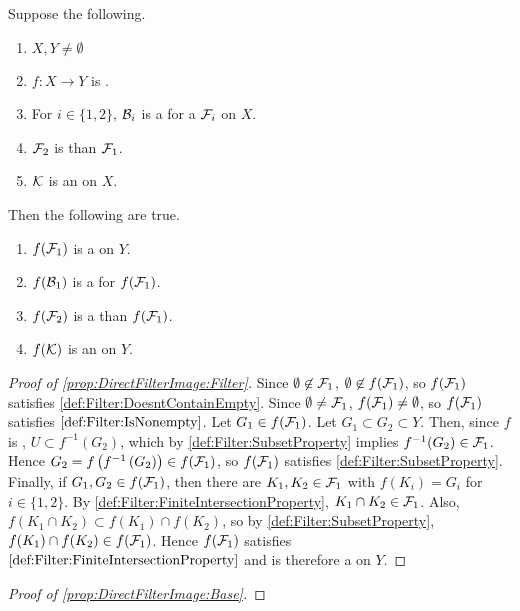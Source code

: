 \begin{prop}
\label{prop:DirectFilterImage}
Suppose the following. 
\begin{enumerate}
    \item $X,Y \neq \emptyset$
    \item $f:X \to Y$ is \Surjective.
    \item For $i \in \{1,2\}$, $\mathcal{B}_i$ is a \FilterBase for a \Filter $\mathcal{F}_i$ on $X$. 
    \item $\mathcal{F}_2$ is \FinerFilter than $\mathcal{F}_1$. 
    \item $\mathcal{K}$ is an \UltrafilterBase on $X$. 
\end{enumerate}
Then the following are true.
\begin{enumerate}[label=(\roman*), ref={\ref{prop:DirectFilterImage}.~\roman*}]
\item \label{prop:DirectFilterImage:Filter} $f(\mathcal{F}_1)$ is a \Filter on $Y$. 
\item \label{prop:DirectFilterImage:Base} $f(\mathcal{B}_1)$ is a \FilterBase for $f(\mathcal{F}_1)$. 
\item \label{prop:DirectFilterImage:Order} $f(\mathcal{F}_2)$ is a \FinerFilter than $f(\mathcal{F}_1)$. 
\item \label{prop:DirectFilterImage:Ultrafilter} $f(\mathcal{K})$ is an \UltrafilterBase on $Y$. 
\end{enumerate}
\begin{proof}[Proof of \ref{prop:DirectFilterImage:Filter}]
    Since $\emptyset \not \in \mathcal{F}_1$, 
    $\emptyset \not \in f(\mathcal{F}_1)$, so 
    $f(\mathcal{F}_1)$ satisfies \ref{def:Filter:DoesntContainEmpty}.
    Since $\emptyset \neq \mathcal{F}_1$, $f(\mathcal{F}_1) \neq \emptyset$, 
    so $f(\mathcal{F}_1)$ satisfies $\ref{def:Filter:IsNonempty}$.
    Let $G_1 \in f(\mathcal{F}_1)$. Let $G_1 \subset G_2 \subset Y$. 
    Then, since $f$ is \Surjective, $U \subset f^{-1}(G_2)$, 
    which by 
    \ref{def:Filter:SubsetProperty} implies $f^{-1}(G_2) \in \mathcal{F}_1$. 
    Hence $G_2=f\left( f^{-1}\left( G_2\right)\right) \in f(\mathcal{F}_1)$, so 
    $f(\mathcal{F}_1)$ satisfies \ref{def:Filter:SubsetProperty}. 
    Finally, if $G_1,G_2 \in f(\mathcal{F}_1)$, then 
    there are $K_1,K_2 \in \mathcal{F}_1$ with $f(K_i) =G_i$ for $i \in \{1,2\}$. 
    By \ref{def:Filter:FiniteIntersectionProperty}, $K_1 \cap K_2 \in \mathcal{F}_1$. 
    Also, $f(K_1 \cap K_2) \subset f(K_1) \cap f(K_2)$, 
    so by \ref{def:Filter:SubsetProperty}, $f(K_1) \cap f(K_2) \in f(\mathcal{F}_1)$.
    Hence $f(\mathcal{F}_1)$ satisfies $\ref{def:Filter:FiniteIntersectionProperty}$
    and is therefore a \Filter on $Y$. 
\end{proof}
\begin{proof}[Proof of \ref{prop:DirectFilterImage:Base}]

\end{proof}
\end{prop}
